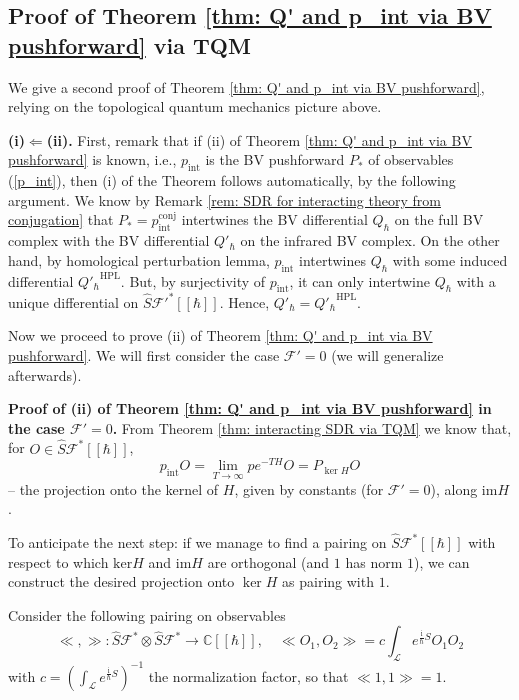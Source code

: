 \documentclass{amsart}
\theoremstyle{plain} %
\theoremstyle{definition}
\theoremstyle{remark}
\newcommand{\mr}{\mathrm}
\newcommand{\ra}{\rightarrow}
\newcommand{\wh}{\widehat}
\newcommand{\F}{\mathcal{F}}
\newcommand{\LL}{\mathcal{L}}
\newcommand{\CC}{\mathbb{C}}
\newcommand{\ii}{\mathrm{int}}
\newcommand{\iii}{\mathrm{i}}
\newcommand{\fun}{\widehat{S}\mathcal{F}^*[[\hbar]]}
\begin{document}
\subsection{Proof of Theorem \ref{thm: Q' and p_int via BV pushforward} via TQM}\label{ss: TQM proof of thm on Q'_hbar and p_int}
We give a second proof of Theorem \ref{thm: Q' and p_int via BV pushforward}, relying on the topological quantum mechanics picture above.

\textbf{(i)$\Leftarrow$(ii).} First, remark that if (ii) of Theorem \ref{thm: Q' and p_int via BV pushforward} is known, i.e., $p_\ii$ is the BV pushforward $P_*$ of observables (\ref{p_int}), then (i) of the Theorem follows automatically, by the following argument. We know by Remark \ref{rem: SDR for interacting theory from conjugation} that $P_*=p_\ii^\mr{conj}$ intertwines the BV differential $Q_\hbar$ on the full BV complex with the BV differential $Q'_\hbar$ on the infrared BV complex. On the other hand, by homological perturbation lemma, $p_\ii$ intertwines $Q_\hbar$ with some induced differential ${Q'_\hbar}^{\mr{HPL}}$. But, by surjectivity of $p_\ii$, it can only intertwine $Q_\hbar$ with a unique differential on $\wh{S}\F'^*[[\hbar]]$. Hence, $Q'_\hbar={Q'_\hbar}^{\mr{HPL}}$.

Now we proceed to prove (ii) of Theorem \ref{thm: Q' and p_int via BV pushforward}. We will first consider the case $\F'=0$ (we will generalize afterwards).

\textbf{Proof of (ii) of Theorem \ref{thm: Q' and p_int via BV pushforward} 
in the case $\F'=0$.}
From Theorem \ref{thm: interacting SDR via TQM} we know that, for $O\in \fun$, 
\begin{equation}\label{p_int O as projection to ker whH}
p_\ii O=\lim_{T\ra\infty} p e^{-TH}O=P_{\ker H}O
\end{equation}
-- the projection onto the kernel of $H$, given by constants (for $\F'=0$), along $\mr{im}H$.

To anticipate the next step: 
if we manage to find a pairing on $\fun$ with respect to which $\mr{ker}H$ and $\mr{im}H$ are orthogonal (and $1$ has norm $1$), we can construct the desired projection onto $\ker H$ as pairing with $1$.

Consider the following pairing on observables
\begin{equation}\label{pairing <<,>>}
    \ll,\gg \colon \wh{S}\F^*\otimes \wh{S}\F^* \ra \CC[[\hbar]],\quad
    \ll O_1,O_2\gg = c \int_{\LL} e^{\frac{\iii}{\hbar}S}O_1 O_2
\end{equation}
with $c=(\int_\LL e^{\frac{\iii}{\hbar}S})^{-1}$ the normalization factor, so that $\ll 1,1\gg=1$.
\end{document}
